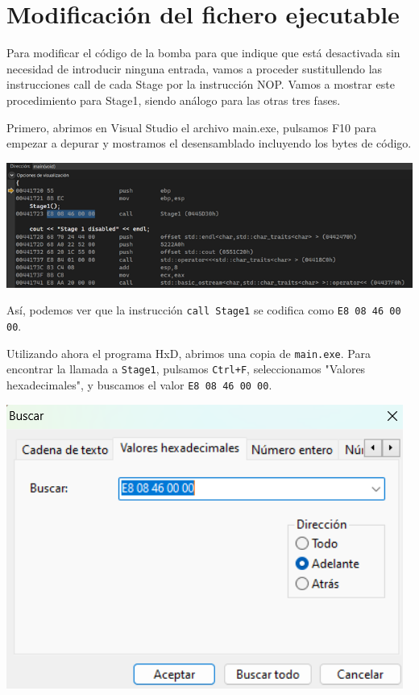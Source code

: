 \documentclass[11pt,a4paper]{article}
\begin{document}
\section{Modificación del fichero ejecutable}
Para modificar el código de la bomba para que indique que está desactivada sin necesidad de
introducir ninguna entrada, vamos a proceder sustitullendo las instrucciones call de cada Stage
por la instrucción NOP. Vamos a mostrar este procedimiento para Stage1, siendo análogo para las
otras tres fases.

\vspace{2mm}
Primero, abrimos en Visual Studio el archivo main.exe, pulsamos F10 para empezar a depurar y mostramos el desensamblado incluyendo los bytes de código.
\begin{center}
  \includegraphics[width=\textwidth]{Modificacion/img1.png}
\end{center}
\noindent Así, podemos ver que la instrucción \texttt{call Stage1} se 
codifica como \texttt{E8 08 46 00 00}.

\vspace{3mm}
Utilizando ahora el programa HxD, abrimos una copia de \texttt{main.exe}.
Para encontrar la llamada a \texttt{Stage1}, pulsamos \texttt{Ctrl+F},
seleccionamos "Valores hexadecimales", y buscamos el valor
\texttt{E8 08 46 00 00}.
\begin{center}
  \includegraphics[width=\textwidth]{Modificacion/img2.png}
\end{center}
\end{document}
